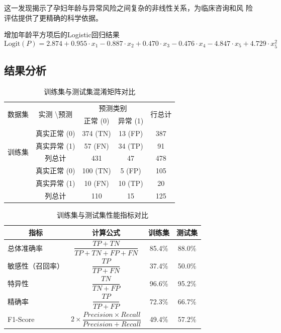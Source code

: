 \documentclass[withoutpreface,notoc]{cumcmthesis}
\begin{document}
	这一发现揭示了孕妇年龄与异常风险之间复杂的非线性关系，为临床咨询和风
	险评估提供了更精确的科学依据。

	增加年龄平方项后的Logistic回归结果
	\begin{equation*}
	\label{logit2}
	\text{Logit}(P) = 2.874 + 0.955 \cdot x_{1} - 0.887 \cdot x_{2} + 0.470 \cdot x_{3} - 0.476 \cdot x_{4} - 4.847 \cdot x_{5} +4.729 \cdot x^{2}_{5}
	\end{equation*}


	\subsection{结果分析}

	\begin{table}[H]
	\centering
	\caption{训练集与测试集混淆矩阵对比}
	\label{训练集与测试集混淆矩阵对比}
		\begin{tabular}{|c|c|c|c|c|}
		\hline
		\multirow{2}{*}{数据集} & \multirow{2}{*}{实测 \textbackslash 预测} & \multicolumn{2}{c|}{预测类别} & \multirow{2}{*}{行总计} \\ \cline{3-4}
		& & 正常 (0) & 异常 (1) & \\ \hline
		\multirow{4}{*}{训练集} & 真实正常 (0) & 374 (TN) & 13 (FP) & 387 \\ \cline{2-5}
		& 真实异常 (1) & 57 (FN) & 34 (TP) & 91 \\ \cline{2-5}
		& 列总计 & 431 & 47 & 478 \\ \hline
		\multirow{4}{*}{测试集} & 真实正常 (0) & 100 (TN) & 5 (FP) & 105 \\ \cline{2-5}
		& 真实异常 (1) & 10 (FN) & 10 (TP) & 20 \\ \cline{2-5}
		& 列总计 & 110 & 15 & 125 \\ \hline
		\end{tabular}
	\end{table}


	\begin{table}[H]
	\centering
	\caption{训练集与测试集性能指标对比}
	\label{训练集与测试集性能指标对比}
	\renewcommand{\arraystretch}{2.2} %
		\begin{tabular}{|l|c|c|c|}
		\hline
		\multicolumn{1}{|c|}{\textbf{指标}} & \multicolumn{1}{c|}{\textbf{计算公式}} & \multicolumn{1}{c|}{\textbf{训练集}} & \multicolumn{1}{c|}{\textbf{测试集}} \\ 
		\hline
		总体准确率 & $\dfrac{TP + TN}{TP + TN + FP + FN}$ & 85.4\% & 88.0\% \\ 
		\hline
		敏感性（召回率） & $\dfrac{TP}{TP + FN}$ & 37.4\% & 50.0\% \\ 
		\hline
		特异性 & $\dfrac{TN}{TN + FP}$ & 96.6\% & 95.2\% \\ 
		\hline
		精确率 & $\dfrac{TP}{TP + FP}$ & 72.3\% & 66.7\% \\ 
		\hline
		F1-Score & $2 \times \dfrac{Precision \times Recall}{Precision + Recall}$ & 49.4\% & 57.2\% \\ 
		\hline
		\end{tabular}
	\end{table}
\end{document}
